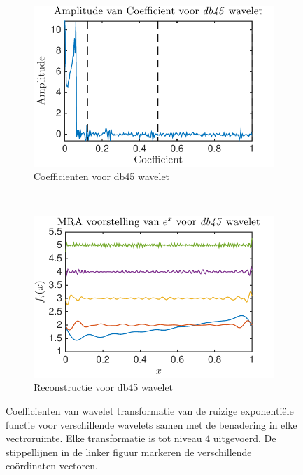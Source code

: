\begin{figure}
\begin{subfigure}[b]{0.4\textwidth}
        \includegraphics[width=\textwidth]{../src/denoising/db45_Noise/coef_exp_db45_4_noise_10}
        \caption{Coefficienten voor db45 wavelet}
    \end{subfigure}
    ~ %
    \begin{subfigure}[b]{0.4\textwidth}
        \includegraphics[width=\textwidth]{../src/denoising/db45_Noise/MRA_exp_db45_4_noise_10}
        \caption{Reconstructie voor db45 wavelet}
    \end{subfigure}
    \caption{Coefficienten van wavelet transformatie van de ruizige exponenti\"ele functie voor verschillende wavelets samen met de benadering in elke vectroruimte. Elke transformatie is tot niveau 4 uitgevoerd. De stippellijnen in de linker figuur markeren de verschillende co\"ordinaten vectoren.}\label{fig:exp_Noise_noise_10}
\end{figure}






